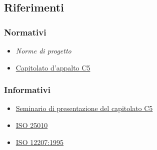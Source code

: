 \documentclass[../piano-di-qualifica.tex]{subfiles}
\begin{document}
\subsection{Riferimenti}%
\label{sub:riferimenti}
\subsubsection{Normativi}%
\label{par:normativi}
\begin{itemize}
  \item \textit{Norme di progetto}
  \item \href{https://www.math.unipd.it/~tullio/IS-1/2019/Progetto/C5.pdf}{Capitolato d'appalto C5}
\end{itemize}
\subsubsection{Informativi}%
\label{par:informativi}
\begin{itemize}
  \item \href{https://www.math.unipd.it/~tullio/IS-1/2019/Dispense/C5a.pdf}{Seminario di presentazione del capitolato C5}
  \item \href{https://iso25000.com/index.php/en/iso-25000-standards/iso-25010}{ISO 25010}
  \item \href{https://www.math.unipd.it/~tullio/IS-1/2009/Approfondimenti/ISO_12207-1995.pdf}{ISO 12207:1995}
\end{itemize}
\end{document}
